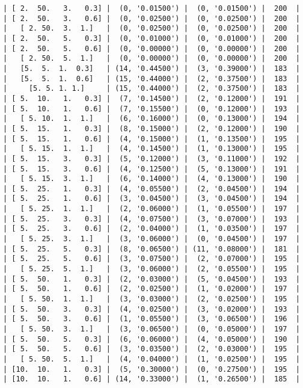 \documentclass{article}
\begin{document}
\begin{verbatim}
| [ 2.  50.   3.   0.3] |  (0, '0.01500') |  (0, '0.01500') |  200  |
| [ 2.  50.   3.   0.6] |  (0, '0.02500') |  (0, '0.02500') |  200  |
|   [ 2. 50.  3.  1.]   |  (0, '0.02500') |  (0, '0.02500') |  200  |
| [ 2.  50.   5.   0.3] |  (0, '0.01000') |  (0, '0.01000') |  200  |
| [ 2.  50.   5.   0.6] |  (0, '0.00000') |  (0, '0.00000') |  200  |
|   [ 2. 50.  5.  1.]   |  (0, '0.00000') |  (0, '0.00000') |  200  |
|   [5.  5.  1.  0.3]   | (14, '0.44500') |  (3, '0.39000') |  183  |
|   [5.  5.  1.  0.6]   | (15, '0.44000') |  (2, '0.37500') |  183  |
|     [5. 5. 1. 1.]     | (15, '0.44000') |  (2, '0.37500') |  183  |
| [ 5.  10.   1.   0.3] |  (7, '0.14500') |  (2, '0.12000') |  191  |
| [ 5.  10.   1.   0.6] |  (7, '0.15500') |  (0, '0.12000') |  193  |
|   [ 5. 10.  1.  1.]   |  (6, '0.16000') |  (0, '0.13000') |  194  |
| [ 5.  15.   1.   0.3] |  (8, '0.15000') |  (2, '0.12000') |  190  |
| [ 5.  15.   1.   0.6] |  (4, '0.15000') |  (1, '0.13500') |  195  |
|   [ 5. 15.  1.  1.]   |  (4, '0.14500') |  (1, '0.13000') |  195  |
| [ 5.  15.   3.   0.3] |  (5, '0.12000') |  (3, '0.11000') |  192  |
| [ 5.  15.   3.   0.6] |  (4, '0.12500') |  (5, '0.13000') |  191  |
|   [ 5. 15.  3.  1.]   |  (6, '0.14000') |  (4, '0.13000') |  190  |
| [ 5.  25.   1.   0.3] |  (4, '0.05500') |  (2, '0.04500') |  194  |
| [ 5.  25.   1.   0.6] |  (3, '0.04500') |  (3, '0.04500') |  194  |
|   [ 5. 25.  1.  1.]   |  (2, '0.06000') |  (1, '0.05500') |  197  |
| [ 5.  25.   3.   0.3] |  (4, '0.07500') |  (3, '0.07000') |  193  |
| [ 5.  25.   3.   0.6] |  (2, '0.04000') |  (1, '0.03500') |  197  |
|   [ 5. 25.  3.  1.]   |  (3, '0.06000') |  (0, '0.04500') |  197  |
| [ 5.  25.   5.   0.3] |  (8, '0.06500') | (11, '0.08000') |  181  |
| [ 5.  25.   5.   0.6] |  (3, '0.07500') |  (2, '0.07000') |  195  |
|   [ 5. 25.  5.  1.]   |  (3, '0.06000') |  (2, '0.05500') |  195  |
| [ 5.  50.   1.   0.3] |  (2, '0.03000') |  (5, '0.04500') |  193  |
| [ 5.  50.   1.   0.6] |  (2, '0.02500') |  (1, '0.02000') |  197  |
|   [ 5. 50.  1.  1.]   |  (3, '0.03000') |  (2, '0.02500') |  195  |
| [ 5.  50.   3.   0.3] |  (4, '0.02500') |  (3, '0.02000') |  193  |
| [ 5.  50.   3.   0.6] |  (1, '0.05500') |  (3, '0.06500') |  196  |
|   [ 5. 50.  3.  1.]   |  (3, '0.06500') |  (0, '0.05000') |  197  |
| [ 5.  50.   5.   0.3] |  (6, '0.06000') |  (4, '0.05000') |  190  |
| [ 5.  50.   5.   0.6] |  (3, '0.03500') |  (2, '0.03000') |  195  |
|   [ 5. 50.  5.  1.]   |  (4, '0.04000') |  (1, '0.02500') |  195  |
| [10.  10.   1.   0.3] |  (5, '0.30000') |  (0, '0.27500') |  195  |
| [10.  10.   1.   0.6] | (14, '0.33000') |  (1, '0.26500') |  185  |

\end{verbatim}
\end{document}
